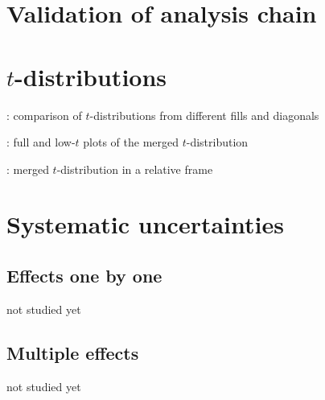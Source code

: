\section{Validation of analysis chain}



\section{$t$-distributions}

\> : comparison of $t$-distributions from different fills and diagonals

\> : full and low-$t$ plots of the merged $t$-distribution

\> : merged $t$-distribution in a relative frame


\section{Systematic uncertainties}

\subsection{Effects one by one}

\> not studied yet

\subsection{Multiple effects}

\> not studied yet



\bye
